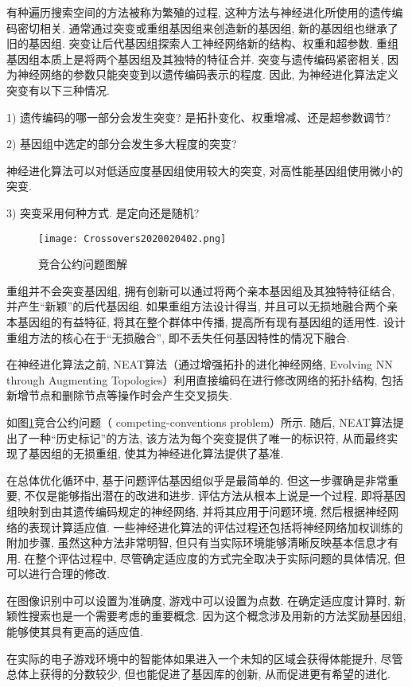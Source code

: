 {%
\begin{remark}
有种遍历搜索空间的方法被称为繁殖的过程, 这种方法与神经进化所使用的遗传编码密切相关. 通常通过突变或重组基因组来创造新的基因组, 新的基因组也继承了旧的基因组. 突变让后代基因组探索人工神经网络新的结构、权重和超参数. 重组基因组本质上是将两个基因组及其独特的特征合并.
突变与遗传编码紧密相关, 因为神经网络的参数只能突变到以遗传编码表示的程度. 因此, 为神经进化算法定义突变有以下三种情况.

1) 遗传编码的哪一部分会发生突变? 是拓扑变化、权重增减、还是超参数调节?

2) 基因组中选定的部分会发生多大程度的突变?
\begin{example}
  神经进化算法可以对低适应度基因组使用较大的突变, 对高性能基因组使用微小的突变.
\end{example}

3) 突变采用何种方式. 是定向还是随机?
\begin{figure}[H]
\centering
\texttt{[image: Crossovers2020020402.png]}
\caption{竞合公约问题图解}
\label{Crossovers2020020402}
\end{figure}

重组并不会突变基因组, 拥有创新可以通过将两个亲本基因组及其独特特征结合, 并产生“新颖”的后代基因组. 如果重组方法设计得当, 并且可以无损地融合两个亲本基因组的有益特征, 将其在整个群体中传播, 提高所有现有基因组的适用性.
设计重组方法的核心在于“无损融合”, 即不丢失任何基因特性的情况下融合.
\begin{example}
  在神经进化算法之前, NEAT算法（通过增强拓扑的进化神经网络, Evolving NN through Augmenting Topologies）利用直接编码在进行修改网络的拓扑结构, 包括新增节点和删除节点等操作时会产生交叉损失.
\end{example}

如图\ref{Crossovers2020020402}竞合公约问题（ competing-conventions problem）所示. 随后, NEAT算法提出了一种“历史标记”的方法, 该方法为每个突变提供了唯一的标识符, 从而最终实现了基因组的无损重组, 使其为神经进化算法提供了基准.
\end{remark}

在总体优化循环中, 基于问题评估基因组似乎是最简单的. 但这一步骤确是非常重要, 不仅是能够指出潜在的改进和进步. 评估方法从根本上说是一个过程, 即将基因组映射到由其遗传编码规定的神经网络, 并将其应用于问题环境, 然后根据神经网络的表现计算适应值. 一些神经进化算法的评估过程还包括将神经网络加权训练的附加步骤, 虽然这种方法非常明智, 但只有当实际环境能够清晰反映基本信息才有用. 在整个评估过程中, 尽管确定适应度的方式完全取决于实际问题的具体情况, 但可以进行合理的修改.
\begin{example}
  在图像识别中可以设置为准确度, 游戏中可以设置为点数. 在确定适应度计算时, 新颖性搜索也是一个需要考虑的重要概念. 因为这个概念涉及用新的方法奖励基因组, 能够使其具有更高的适应值.
\end{example}
\begin{example}
  在实际的电子游戏环境中的智能体如果进入一个未知的区域会获得体能提升, 尽管总体上获得的分数较少, 但也能促进了基因库的创新, 从而促进更有希望的进化.
\end{example}
}
